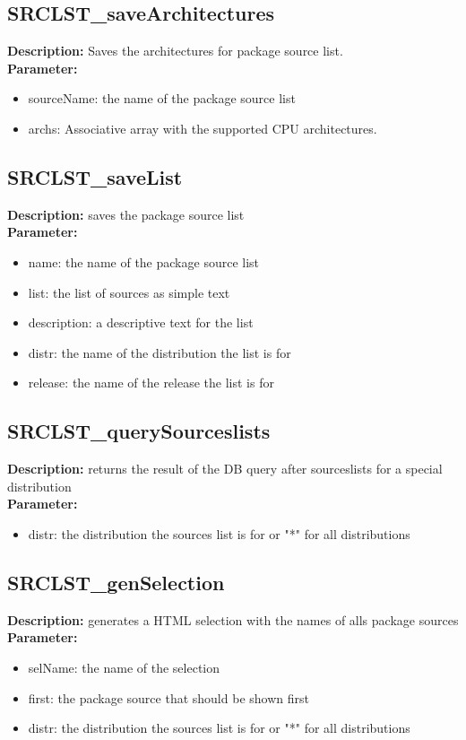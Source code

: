 \subsection{SRCLST\_saveArchitectures}
\textbf{Description:} Saves the architectures for package source list.\\
\textbf{Parameter:}
\begin{itemize}
\item sourceName: the name of the package source list
\item archs: Associative array with the supported CPU architectures.
\end{itemize}

\subsection{SRCLST\_saveList}
\textbf{Description:} saves the package source list\\
\textbf{Parameter:}
\begin{itemize}
\item name: the name of the package source list
\item list: the list of sources as simple text
\item description: a descriptive text for the list
\item distr: the name of the distribution the list is for
\item release: the name of the release the list is for
\end{itemize}

\subsection{SRCLST\_querySourceslists}
\textbf{Description:} returns the result of the DB query after sourceslists for a special distribution\\
\textbf{Parameter:}
\begin{itemize}
\item distr: the distribution the sources list is for or "*" for all distributions
\end{itemize}

\subsection{SRCLST\_genSelection}
\textbf{Description:} generates a HTML selection with the names of alls package sources\\
\textbf{Parameter:}
\begin{itemize}
\item selName: the name of the selection
\item first: the package source that should be shown first
\item distr: the distribution the sources list is for or "*" for all distributions
\end{itemize}

